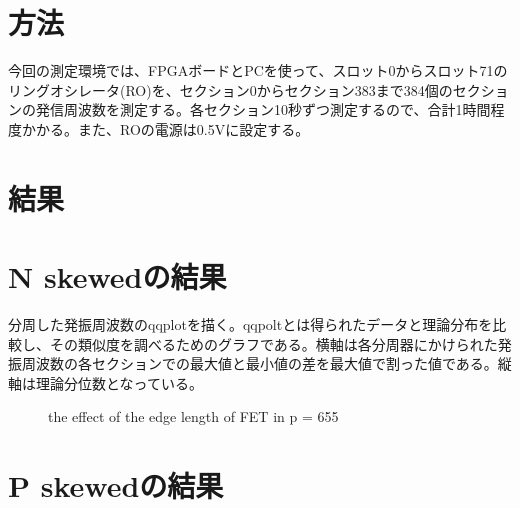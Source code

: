 \documentclass{jsarticle}
\begin{document}
\section{方法}

今回の測定環境では、FPGAボードとPCを使って、スロット0からスロット71のリングオシレータ(RO)を、セクション0からセクション383まで384個のセクションの発信周波数を測定する。各セクション10秒ずつ測定するので、合計1時間程度かかる。また、ROの電源は0.5Vに設定する。

\section{結果}



\section{N skewedの結果}

分周した発振周波数のqqplotを描く。qqpoltとは得られたデータと理論分布を比較し、その類似度を調べるためのグラフである。横軸は各分周器にかけられた発振周波数の各セクションでの最大値と最小値の差を最大値で割った値である。縦軸は理論分位数となっている。

\begin{figure}[H]
	\centering
	\caption{the effect of the edge length of FET in p = 655}
	\label{fig:the_effect_of_the_edge_length_of_fet_in_p_655}
\end{figure}


\section{P skewedの結果}
\end{document}
